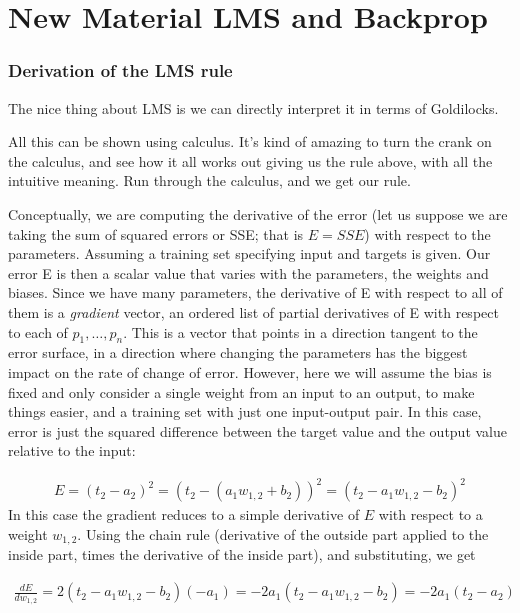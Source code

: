 \chapter{New Material LMS and Backprop}

\subsection{Derivation of the LMS rule}

The nice thing about LMS is we can directly interpret it in terms of Goldilocks.

All this can be shown using calculus. It's kind of amazing to turn the crank on the calculus, and see how it all works out giving us the rule above, with all the intuitive meaning. Run through the calculus, and we get our rule. 

Conceptually, we are computing the derivative of the error (let us suppose we are taking the sum of squared errors or SSE; that is $E = SSE$) with respect to the parameters. Assuming a training set specifying input and targets is given. Our error E is then a scalar value that varies with the parameters, the weights and biases. Since we have many parameters, the derivative of E with respect to all of them is a \emph{gradient} vector, an ordered list of partial derivatives of E with respect to each of $p_1,\dots, p_n$.  This is a vector that points in a direction tangent to the error surface, in a direction where changing the parameters has the biggest impact on the rate of change of error.  However, here we will assume the bias is fixed and only consider a single weight from an input to an output, to make things easier, and a training set with just one input-output pair.  In this case, error is just the squared difference between the target value and the output value relative to the input:

\begin{eqnarray*}
E = (t_2 - a_2)^2  =  (t_2 - ( a_1 w_{1,2} + b_2))^2  =  (t_2 -  a_1 w_{1,2} -  b_2)^2 
\end{eqnarray*}
In this case the gradient reduces to a simple derivative of $E$ with respect to a weight $w_{1,2}$.  Using the chain rule (derivative of the outside part applied to the inside part, times the derivative of the inside part), and substituting, we get

\begin{eqnarray*}
\frac{dE}{dw_{1,2}} = 2 (t_2 - a_1 w_{1,2} - b_2) (-a_1) =  -2 a_1 (t_2 - a_1 w_{1,2} - b_2) =  -2 a_1 (t_2 - a_2)
\end{eqnarray*}

